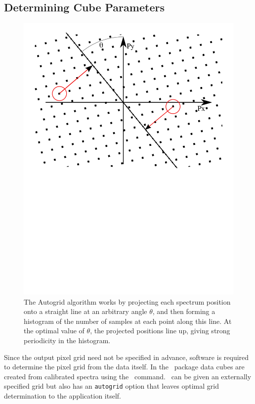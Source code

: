 \documentclass[final,authoryear,5p,times,twocolumn]{elsarticle}
\begin{document}
\subsection{Determining Cube Parameters}
\label{sec:makecube}

\begin{figure}[t]
\includegraphics[width=\columnwidth]{autogrid}
\caption{The Autogrid algorithm works by projecting each spectrum
  position onto a straight line at an arbitrary angle $\theta$, and then
  forming a histogram of the number of samples at each point along
  this line. At the optimal value of $\theta$, the projected positions
  line up, giving strong periodicity in the histogram.}
\label{fig:autogrid}
\end{figure}

Since the output pixel grid need not be specified in advance, software
is required to determine the pixel grid from the data itself. In the
\smurf\ package data cubes are created from calibrated spectra using the
\makecube\ command. \makecube\ can be given an externally specified
grid but also has an \texttt{autogrid} option that leaves optimal grid
determination to the application itself.
\end{document}
